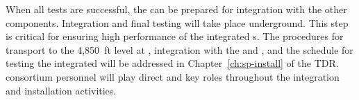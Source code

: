 
When all tests are successful, %
the  can be prepared 
for integration with the other components.  Integration and final testing will take place underground. %
This step is critical for ensuring high performance of the integrated s. The procedures for  transport to the 4,850~ft level at , integration with the  and , and the schedule for testing the integrated  will be addressed in %
Chapter~\ref{ch:sp-install} of the  TDR.  consortium personnel will play direct and key roles throughout the integration and installation activities.  %




